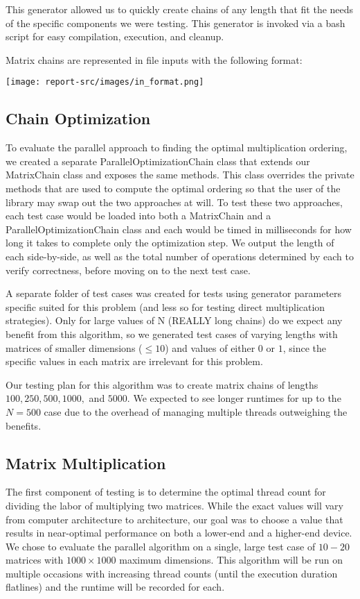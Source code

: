 \documentclass[conference,leqno]{IEEEtran}
\begin{document}
This generator allowed us to quickly create chains of any length that fit the needs of the specific components we were testing. This generator is invoked via a bash script for easy compilation, execution, and cleanup.

Matrix chains are represented in file inputs with the following format:

\vspace{.2cm}
\texttt{[image: report-src/images/in\_format.png]}

\subsection{Chain Optimization}
To evaluate the parallel approach to finding the optimal multiplication ordering, we created a separate ParallelOptimizationChain class that extends our MatrixChain class and exposes the same methods. This class overrides the private methods that are used to compute the optimal ordering so that the user of the library may swap out the two approaches at will. To test these two approaches, each test case would be loaded into both a MatrixChain and a ParallelOptimizationChain class and each would be timed in milliseconds for how long it takes to complete only the optimization step. We output the length of each side-by-side, as well as the total number of operations determined by each to verify correctness, before moving on to the next test case.

A separate folder of test cases was created for tests using generator parameters specific suited for this problem (and less so for testing direct multiplication strategies). Only for large values of N (REALLY long chains) do we expect any benefit from this algorithm, so we generated test cases of varying lengths with matrices of smaller dimensions ($\leq 10$) and values of either $0$ or $1$, since the specific values in each matrix are irrelevant for this problem.

Our testing plan for this algorithm was to create matrix chains of lengths $100, 250, 500, 1000,$ and $5000$. We expected to see longer runtimes for up to the $N = 500$ case due to the overhead of managing multiple threads outweighing the benefits.

\subsection{Matrix Multiplication}
The first component of testing is to determine the optimal thread count for dividing the labor of multiplying two matrices. While the exact values will vary from computer architecture to architecture, our goal was to choose a value that results in near-optimal performance on both a lower-end and a higher-end device. We chose to evaluate the parallel algorithm on a single, large test case of $10 - 20$ matrices with $1000 \times 1000$ maximum dimensions. This algorithm will be run on multiple occasions with increasing thread counts (until the execution duration flatlines) and the runtime will be recorded for each.
\end{document}
